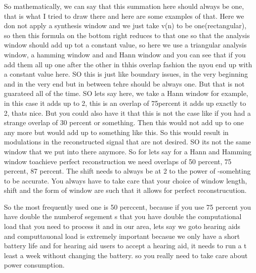 So mathematically, we can say that this summation here should always be one, that is what I tried to draw there and here are some examples of that.  Here we don not apply a synthesis window and we just take v(n) to be one(rectangular), so then this formula on the bottom right reduces to that one so that the analysis window should add up tot a constant value, so here we use a triangular analysis window, a hamming window and and Hann window and you can see that if you add them all up one after the other in thhis overlap fashion the nyou end up with a constant value here.  SO this is just like boundary issues, in the very beginning and in the very end but in between tehre should be always one. But that is not guarateed all of the time.  SO lets say here, we take a Hann window for example, in this case it adds up to 2, this is an overlap of 75percent it adds up exactly to 2, thats nice.  But you could also have it that this is not the case like if you had a strange overlap of 30 percent or something.  Then this would not add up to one any more but would add up to something like this. So this would result in modulations in the reconstructed signal that are not desired.  SO its not the same window that we put into there anymore.  So for lets say for a Hann and Hamming window toachieve perfect reconstruction we need overlaps of 50 percent, 75 percent, 87 percent.  The shift needs to always be at 2 to the power of -somehting to be accurate.  You always have to take care that your choice of window length, shift and the form of window are such that it allows for perfect reconstrucution. 

So the most frequently used one is 50 perccent, because if you use 75 percent you have double the numberof segement s that you have double the computational load that you need to process it and in our area, lets say we goto hearing aids and computtauonal load is extremely important becasue we only have a short battery life and for hearing aid users to accept a hearing aid, it needs to run a t least a week without changing the battery. so you really need to take care about power consumption.

